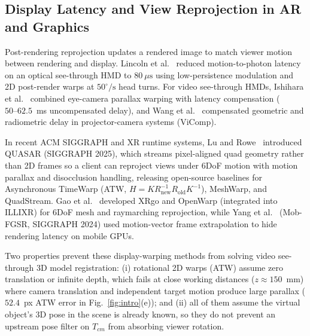 \documentclass[journal]{IEEEtran}
\begin{document}
\subsection{Display Latency and View Reprojection in AR and Graphics}
Post-rendering reprojection updates a rendered image to match viewer motion between rendering and display. Lincoln et al.~\cite{lincoln2016motion} reduced motion-to-photon latency on an optical see-through HMD to $80~\mu\text{s}$ using low-persistence modulation and 2D post-render warps at $50^\circ/\text{s}$ head turns. For video see-through HMDs, Ishihara et al.~\cite{ishihara2023integrating} combined eye-camera parallax warping with latency compensation ($50\text{--}62.5$~ms uncompensated delay), and Wang et al.~\cite{wang2024vicomp} compensated geometric and radiometric delay in projector-camera systems (ViComp).

In recent ACM SIGGRAPH and XR runtime systems, Lu and Rowe~\cite{lu2025quasar} introduced QUASAR (SIGGRAPH 2025), which streams pixel-aligned quad geometry rather than 2D frames so a client can reproject views under 6DoF motion with motion parallax and disocclusion handling, releasing open-source baselines for Asynchronous TimeWarp (ATW, $H = K R_{\text{new}}^{-1} R_{\text{old}} K^{-1}$), MeshWarp, and QuadStream. Gao et al.~\cite{gao2025xrgo} developed XRgo and OpenWarp (integrated into ILLIXR) for 6DoF mesh and raymarching reprojection, while Yang et al.~\cite{yang2024mobfgsr} (Mob-FGSR, SIGGRAPH 2024) used motion-vector frame extrapolation to hide rendering latency on mobile GPUs.

Two properties prevent these display-warping methods from solving video see-through 3D model registration: (i) rotational 2D warps (ATW) assume zero translation or infinite depth, which fails at close working distances ($z \approx 150$~mm) where camera translation and independent target motion produce large parallax ($52.4$~px ATW error in Fig.~\ref{fig:intro}(e)); and (ii) all of them assume the virtual object's 3D pose in the scene is already known, so they do not prevent an upstream pose filter on $T_{cm}$ from absorbing viewer rotation.
\end{document}
